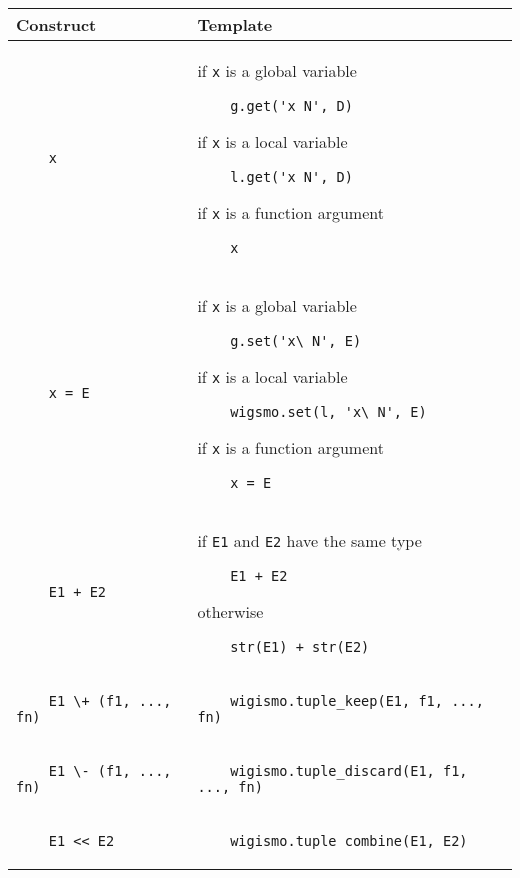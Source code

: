\documentclass{WigReport}
\begin{document}
\noindent
\begin{tabular}{| p{20em} | p{30em} |}
    \hline
    Construct & Template \\ \hline
    \begin{verbatim}
    x
    \end{verbatim}
    &
    if {\tt x} is a global variable
    \begin{verbatim}
    g.get('x_N', D)
    \end{verbatim}
    if {\tt x} is a local variable 
    \begin{verbatim}
    l.get('x_N', D)
    \end{verbatim}
    if {\tt x} is a function argument
    \begin{verbatim}
    x 
    \end{verbatim}
    \\ \hline
    \begin{verbatim}
    x = E
    \end{verbatim}
    & 
    if {\tt x} is a global variable 
    \begin{verbatim}
    g.set('x\_N', E)
    \end{verbatim}
    if {\tt x} is a local variable
    \begin{verbatim}
    wigsmo.set(l, 'x\_N', E)
    \end{verbatim}
    if {\tt x} is a function argument  
    \begin{verbatim}
    x = E
    \end{verbatim}
    \\ \hline
    \begin{verbatim}
    E1 + E2
    \end{verbatim}
    &
    if {\tt E1} and {\tt E2} have the same type
    \begin{verbatim}
    E1 + E2
    \end{verbatim}
    otherwise
    \begin{verbatim}
    str(E1) + str(E2)
    \end{verbatim}
    \\ \hline
    \begin{verbatim}
    E1 \+ (f1, ..., fn) 
    \end{verbatim}
    &
    \begin{verbatim}
    wigismo.tuple_keep(E1, f1, ..., fn)
    \end{verbatim}
    \\ \hline
    \begin{verbatim}
    E1 \- (f1, ..., fn) 
    \end{verbatim}
    &
    \begin{verbatim}
    wigismo.tuple_discard(E1, f1, ..., fn)
    \end{verbatim}
    \\ \hline
    \begin{verbatim}
    E1 << E2
    \end{verbatim}
    &
    \begin{verbatim}
    wigismo.tuple_combine(E1, E2)
    \end{verbatim}
    \\ \hline
\end{tabular}
\end{document}
